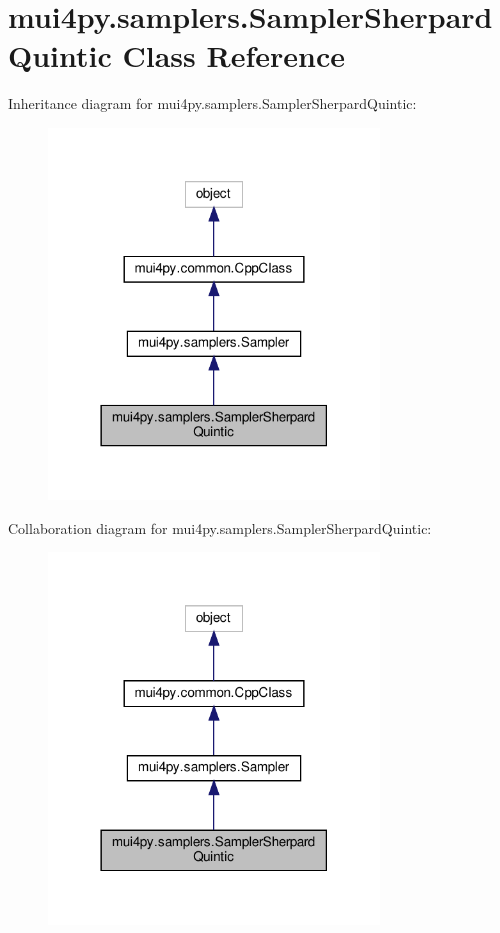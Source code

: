 \hypertarget{classmui4py_1_1samplers_1_1_sampler_sherpard_quintic}{}\section{mui4py.\+samplers.\+Sampler\+Sherpard\+Quintic Class Reference}
\label{classmui4py_1_1samplers_1_1_sampler_sherpard_quintic}


Inheritance diagram for mui4py.\+samplers.\+Sampler\+Sherpard\+Quintic\+:
\nopagebreak
\begin{figure}[H]
\begin{center}
\leavevmode
\includegraphics[width=249pt]{classmui4py_1_1samplers_1_1_sampler_sherpard_quintic__inherit__graph}
\end{center}
\end{figure}


Collaboration diagram for mui4py.\+samplers.\+Sampler\+Sherpard\+Quintic\+:
\nopagebreak
\begin{figure}[H]
\begin{center}
\leavevmode
\includegraphics[width=249pt]{classmui4py_1_1samplers_1_1_sampler_sherpard_quintic__coll__graph}
\end{center}
\end{figure}
